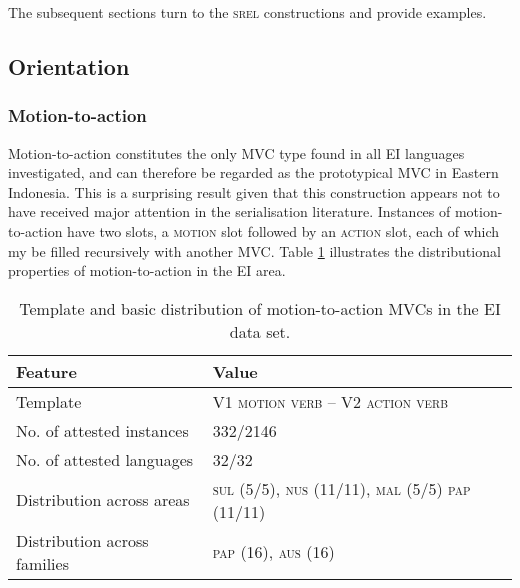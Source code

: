 The subsequent sections turn to the \textsc{srel} constructions and provide examples.

\subsection{Orientation} \label{sec:orientation}
\subsubsection{Motion-to-action} \label{sec:motion-to-action}

Motion-to-action constitutes the only MVC type found in all EI languages investigated, and can therefore be regarded as the prototypical MVC in Eastern Indonesia. This is a surprising result given that this construction appears not to have received major attention in the serialisation literature. Instances of motion-to-action have two slots, a \textsc{motion} slot followed by an \textsc{action} slot, each of which my be filled recursively with another MVC. Table \ref{table:motion-to-action} illustrates the distributional properties of motion-to-action in the EI area.

\begin{table}


\begin{tabular}{ll}
\lsptoprule
Feature&Value\tabularnewline
\hline
Template&V1 \textsc{motion verb} -- V2 \textsc{action verb}\tabularnewline
No. of attested instances& 332/2146 \tabularnewline
No. of attested languages& 32/32 \tabularnewline
Distribution across areas& \textsc{sul} (5/5), \textsc{nus} (11/11), \textsc{mal} (5/5) \textsc{pap} (11/11) \tabularnewline
Distribution across families& \textsc{pap} (16), \textsc{aus} (16) \tabularnewline
\hline
\end{tabular}
\caption[Template and basic distribution of motion-to-action MVCs]{Template and basic distribution of motion-to-action MVCs in the EI data set.}
\label{table:motion-to-action}
\end{table}


